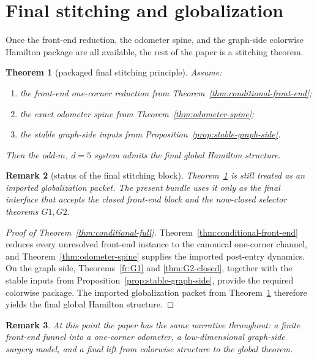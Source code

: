 \documentclass[11pt]{article}
\newtheorem{theorem}{Theorem}[section]
\newtheorem{remark}[theorem]{Remark}
\begin{document}
\section{Final stitching and globalization}

Once the front-end reduction, the odometer spine, and the graph-side colorwise
Hamilton package are all available, the rest of the paper is a stitching theorem.

\begin{theorem}[packaged final stitching principle]
\label{thm:stitching}
Assume:
\begin{enumerate}[label=\textup{(\arabic*)},leftmargin=2.8em]
\item the front-end one-corner reduction from
      Theorem~\ref{thm:conditional-front-end};
\item the exact odometer spine from Theorem~\ref{thm:odometer-spine};
\item the stable graph-side inputs from
      Proposition~\ref{prop:stable-graph-side}.
\end{enumerate}
Then the odd-$m$, $d=5$ system admits the final global Hamilton structure.
\end{theorem}

\begin{remark}[status of the final stitching block]
Theorem~\ref{thm:stitching} is still treated as an imported globalization
packet.  The present bundle uses it only as the final interface that accepts
the closed front-end block and the now-closed selector theorems \(G1,G2\).
\end{remark}

\begin{proof}[Proof of Theorem~\ref{thm:conditional-full}]
Theorem~\ref{thm:conditional-front-end} reduces every unresolved front-end
instance to the canonical one-corner channel, and
Theorem~\ref{thm:odometer-spine} supplies the imported post-entry dynamics.
On the graph side, Theorems~\ref{fr:G1} and \ref{thm:G2-closed}, together
with the stable inputs from Proposition~\ref{prop:stable-graph-side}, provide
the required colorwise package.  The imported globalization packet from
Theorem~\ref{thm:stitching} therefore yields the final global Hamilton
structure.
\end{proof}

\begin{remark}
At this point the paper has the same narrative throughout:
a finite front-end funnel into a one-corner odometer, a low-dimensional
graph-side surgery model, and a final lift from colorwise structure to the
global theorem.
\end{remark}
\end{document}
